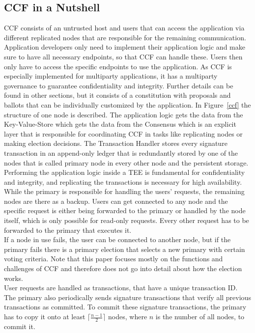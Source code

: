 \subsection{CCF in a Nutshell}
CCF consists of an untrusted host and users that can access the application via different replicated nodes that are responsible for the remaining communication. Application developers only need to implement their application logic and make sure to have all necessary endpoints, so that CCF can handle these. Users then only have to access the specific endpoints to use the application. As CCF is especially implemented for multiparty applications, it has a multiparty governance to guarantee confidentiality and integrity. Further details can be found in other sections, but it consists of a constitution with proposals and ballots that can be individually customized by the application. In Figure~\ref{ccf} the structure of one node is described. The application logic gets the data from the Key-Value-Store which gets the data from the Consensus which is an explicit layer that is responsible for coordinating CCF in tasks like replicating nodes or making election decisions.
  The Transaction Handler stores every signature transaction in an append-only ledger that is redundantly stored by one of the nodes that is called primary node in every other node and the persistent storage. Performing the application logic inside a TEE is fundamental for confidentiality and integrity, and replicating the transactions is necessary for high availability.\\ %
While the primary is responsible for handling the users' requests, the remaining nodes are there as a backup. Users can get connected to any node and the specific request is either being forwarded to the primary or handled by the node itself, which is only possible for read-only requests. Every other request has to be forwarded to the primary that executes it.\\
 If a node in use fails, the user can be connected to another node, but if the primary fails there is a primary election that selects a new primary with certain voting criteria. Note that this paper focuses mostly on the functions and challenges of CCF and therefore does not go into detail about how the election works. \\
 User requests are handled as transactions, that have a unique transaction ID. The primary also periodically sends signature transactions that verify all previous transactions as committed. To commit these signature transactions, the primary has to copy it onto at least $\lceil\frac{n-1}{2}\rceil$ nodes, where $n$ is the number of all nodes, to commit it.\\
